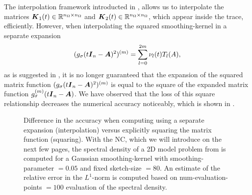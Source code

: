 The interpolation framework introducted in ,
allows us to interpolate the matrices $\boldsymbol{K}_1(t) \in \mathbb{R}^{n_{\Omega} \times n_{\Omega}}$
and $\boldsymbol{K}_2(t) \in \mathbb{R}^{n_{\Omega} \times n_{\Omega}}$,
which appear inside the trace, efficiently.
However, when interpolating the
squared \gls{smoothing-kernel} in a separate expansion
\begin{equation}
    (g_{\sigma}(t\boldsymbol{I}_n - \boldsymbol{A})^2)^{(m)} = \sum_{l=0}^{2m} \nu_l(t) T_l(A),
    \label{equ:3-nystrom-ESS-chebyshev-expansion}
\end{equation}
as is suggested in \cite{lin2017randomized}, it is no longer guaranteed that
the expansion of the squared matrix function $(g_{\sigma}(t\boldsymbol{I}_n - \boldsymbol{A})^2)^{(m)}$
is equal to the square of the expanded matrix function $g_{\sigma}^{(m)}(t\boldsymbol{I}_n - \boldsymbol{A})$.
We have observed that the loss of this square relationship
decreases the numerical accuracy noticeably, which is
shown in .\\
\begin{figure}[ht]
    \centering
    
    \caption{Difference in the accuracy when computing 
        using a separate expansion (interpolation) versus explicitly squaring
        the matrix function (squaring). With the \gls{NC}, which we will introduce
        on the next few pages, the spectral density of a 2D model problem from
        is computed for a Gaussian \gls{smoothing-kernel} with \gls{smoothing-parameter} $=0.05$
        and fixed \gls{sketch-size} $=80$. An estimate of the relative error
        in the $L^1$-norm is computed based on \gls{num-evaluation-points} $=100$
        evaluation of the spectral density.}
    \label{fig:3-nystrom-interpolation-issue}
\end{figure}

